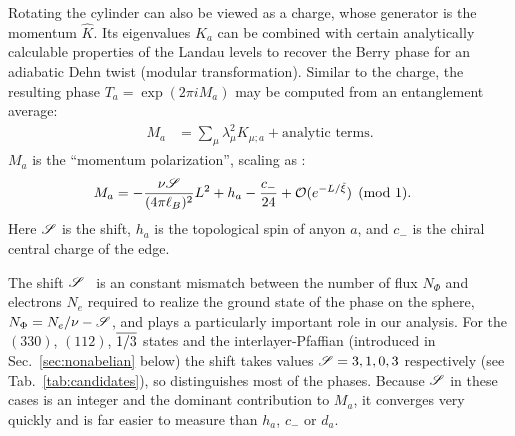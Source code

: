 Rotating the cylinder can also be viewed as a \Uone charge, whose generator is the momentum $\hat{K}$.
Its eigenvalues $K_a$ can be combined with certain analytically calculable properties of the Landau levels to recover 
the Berry phase for an adiabatic Dehn twist (modular transformation).
Similar to the charge, the resulting phase $T_a = \exp(2\pi i M_a)$ may be computed from an entanglement average:
\begin{align}
	M_a &=  \sum_\mu \lambda^2_\mu K_{\mu; a} + \textrm{analytic terms} .
\end{align}
$M_a$ is the ``momentum polarization'', scaling as \cite{ZaletelQHdmrg13,HHTuMomPol13}:
\begin{align}
	M_a &= -\frac{\nu\mathscr{S}}{(4\pi\ell_B)^2}L^2 + h_a - \frac{c_-}{24} + \mathcal{O}(e^{-L / \tilde{\xi}}) \pmod{1}.
	\label{mompol}
\end{align}
Here $\mathscr{S}$ is the shift, $h_a$ is the topological spin of anyon $a$, and $c_-$ is the chiral central charge of the edge.

The shift $\mathscr{S}$~\cite{wenzee} is an constant mismatch between the number of flux $N_\Phi$ and electrons $N_e$ required to realize the ground state of the phase on the sphere, $N_\Phi= N_e / \nu - \mathscr{S}$, and plays a particularly important role in our analysis.
For the $(330)$, $(112)$,  $\overline{1/3}$ states and the interlayer-Pfaffian (introduced in Sec.~\ref{sec:nonabelian} below) the shift takes values $\mathscr{S} = 3, 1, 0, 3$ respectively (see Tab.~\ref{tab:candidates}), so distinguishes most of the phases.
Because $\mathscr{S}$ in these cases is an integer and the dominant contribution to $M_a$, it converges very quickly and is far easier to measure than $h_a$, $c_-$ or $d_a$.


